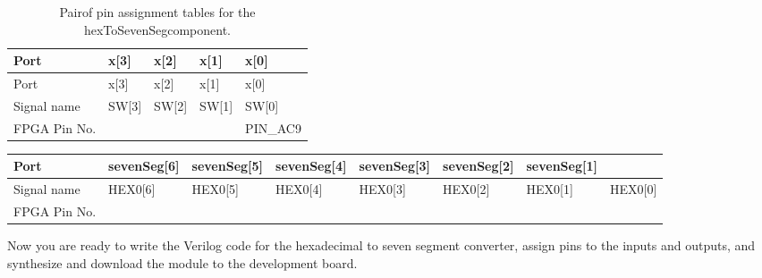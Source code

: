 \begin{longtable}[]{@{}
| >{\raggedright\arraybackslash}p{}|
  >{\raggedright\arraybackslash}p{}|
  >{\raggedright\arraybackslash}p{}|
  >{\raggedright\arraybackslash}p{}|
  >{\raggedright\arraybackslash}p{}|@{}}
\caption{Pairof pin assignment tables for the hexToSevenSegcomponent.}
\label{Hex2Seven_PinAssignment}\tabularnewline
\toprule()
Port & x{[}3{]} & x{[}2{]} & x{[}1{]} & x{[}0{]} \\ \hline
\midrule()
\endfirsthead
\toprule()
Port & x{[}3{]} & x{[}2{]} & x{[}1{]} & x{[}0{]} \\ \hline
\midrule()
\endhead
Signal name & SW{[}3{]} & SW{[}2{]} & SW{[}1{]} & SW{[}0{]} \\ \hline
FPGA Pin No. & & & & PIN\_AC9 \\
\bottomrule()
\end{longtable}

\begin{longtable}[]{@{}
| >{\raggedright\arraybackslash}p{}|
  >{\raggedright\arraybackslash}p{}|
  >{\raggedright\arraybackslash}p{}|
  >{\raggedright\arraybackslash}p{}|
  >{\raggedright\arraybackslash}p{}|
  >{\raggedright\arraybackslash}p{}|
  >{\raggedright\arraybackslash}p{}|
  >{\raggedright\arraybackslash}p{}|@{}}
\toprule()
Port &
sevenSeg{[}6{]} &
sevenSeg{[}5{]} &
sevenSeg{[}4{]} &
sevenSeg{[}3{]} &
sevenSeg{[}2{]} &
sevenSeg{[}1{]} \\ \hline
\midrule()
\endhead
Signal name & HEX0{[}6{]} & HEX0{[}5{]} & HEX0{[}4{]} & HEX0{[}3{]} &
HEX0{[}2{]} & HEX0{[}1{]} & HEX0{[}0{]} \\ \hline
FPGA Pin No. & & & & & & & \\ \hline
\bottomrule()

\end{longtable}
Now you are ready to write the Verilog code for the hexadecimal to seven
segment converter, assign pins to the inputs and outputs, and synthesize
and download the module to the development board.


